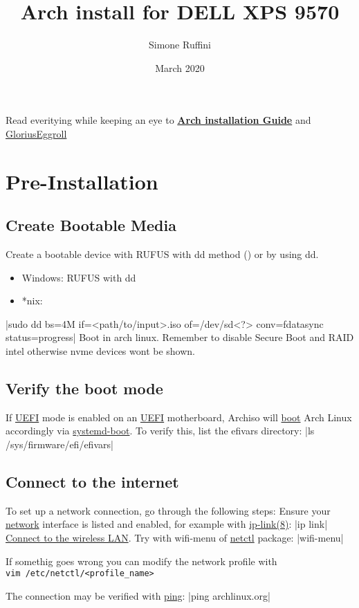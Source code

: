\documentclass[11pt,A4]{article}
\title{Arch install for DELL XPS 9570}
\author{Simone Ruffini }
\date{March 2020}
\newcommand{\linecode}[1]{ \mint[fontsize=\small,bgcolor=ArchCode,frame=single]{bash}|#1|}
\begin{document}
\maketitle
Read everitying while keeping an eye to \href{https://wiki.archlinux.org/index.php/Installation_guide}{\textbf{Arch installation Guide}} and \href{https://www.gloriouseggroll.tv/arch-linux-efi-install-guide/}{GloriusEggroll}
\section{Pre-Installation}
\subsection{Create Bootable Media}
Create a bootable device with RUFUS with dd method () or by using dd.
\begin{itemize}
    \item Windows: RUFUS with dd
    \item *nix:
\end{itemize}

\linecode {sudo dd bs=4M if=<path/to/input>.iso of=/dev/sd<?> conv=fdatasync  status=progress}
Boot in arch linux. Remember to disable Secure Boot and RAID intel otherwise nvme devices wont be shown.
\subsection{Verify the boot mode}
If \href{https://wiki.archlinux.org/index.php/UEFI}{UEFI} mode is enabled on an \href{https://wiki.archlinux.org/index.php/UEFI}{UEFI} motherboard, Archiso will \href{https://wiki.archlinux.org/index.php/Boot}{boot} Arch Linux accordingly via \href{https://wiki.archlinux.org/index.php/Systemd-boot}{systemd-boot}. To verify this, list the efivars directory:
\linecode{ls /sys/firmware/efi/efivars}

\vspace{-5mm}
\subsection{Connect to the internet}
To set up a network connection, go through the following steps:
\newline
Ensure your \href{https://wiki.archlinux.org/index.php/Network_interface}{network} interface is listed and enabled, for example with \href{https://jlk.fjfi.cvut.cz/arch/manpages/man/ip-link.8}{ip-link(8)}:
\linecode{ip link}
\href{https://wiki.archlinux.org/index.php/Wireless_network_configurationc}{Connect to the wireless LAN}.
Try with wifi-menu of \href{https://wiki.archlinux.org/index.php/Netctl}{netctl} package:
\linecode{wifi-menu}
\vspace{-5mm}
\begin{tcolorbox}[colback=ArchGreen,sharp corners,boxrule=0.2mm]
If somethig goes wrong you can modify the network profile with \\ \texttt{vim /etc/netctl/<profile\_name>}
\end{tcolorbox}
The connection may be verified with \href{https://en.wikipedia.org/wiki/ping}{ping}:
\linecode{ping archlinux.org}
\end{document}
